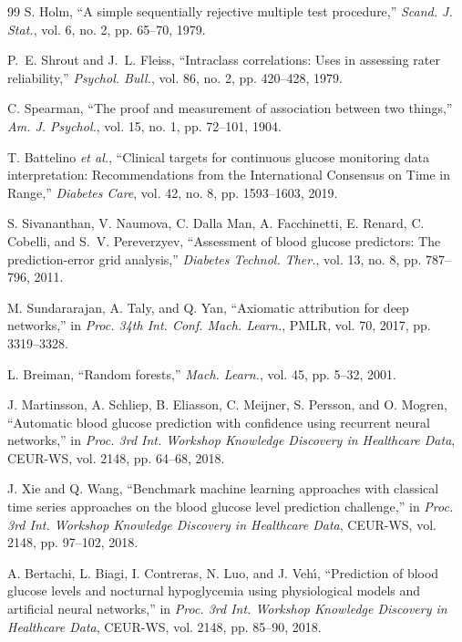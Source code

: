 \documentclass[journal]{IEEEtran}
\begin{document}
\begin{thebibliography}{99}
\label{ref49label} S. Holm, ``A simple sequentially rejective multiple test procedure,'' \emph{Scand. J. Stat.}, vol. 6, no. 2, pp. 65--70, 1979.

\label{ref50label} P.~E. Shrout and J.~L. Fleiss, ``Intraclass correlations: Uses in assessing rater reliability,'' \emph{Psychol. Bull.}, vol. 86, no. 2, pp. 420--428, 1979.

\label{ref51label} C. Spearman, ``The proof and measurement of association between two things,'' \emph{Am. J. Psychol.}, vol. 15, no. 1, pp. 72--101, 1904.

\label{ref52label} T. Battelino \emph{et al.}, ``Clinical targets for continuous glucose monitoring data interpretation: Recommendations from the International Consensus on Time in Range,'' \emph{Diabetes Care}, vol. 42, no. 8, pp. 1593--1603, 2019.

\label{ref53label} S. Sivananthan, V. Naumova, C. Dalla Man, A. Facchinetti, E. Renard, C. Cobelli, and S.~V. Pereverzyev, ``Assessment of blood glucose predictors: The prediction-error grid analysis,'' \emph{Diabetes Technol. Ther.}, vol. 13, no. 8, pp. 787--796, 2011.

\label{ref54label} M. Sundararajan, A. Taly, and Q. Yan, ``Axiomatic attribution for deep networks,'' in \emph{Proc. 34th Int. Conf. Mach. Learn.}, PMLR, vol. 70, 2017, pp. 3319--3328.

\label{ref55label} L. Breiman, ``Random forests,'' \emph{Mach. Learn.}, vol. 45, pp. 5--32, 2001.

\label{ref56label} J. Martinsson, A. Schliep, B. Eliasson, C. Meijner, S. Persson, and O. Mogren, ``Automatic blood glucose prediction with confidence using recurrent neural networks,'' in \emph{Proc. 3rd Int. Workshop Knowledge Discovery in Healthcare Data}, CEUR-WS, vol. 2148, pp. 64--68, 2018.

\label{ref57label} J. Xie and Q. Wang, ``Benchmark machine learning approaches with classical time series approaches on the blood glucose level prediction challenge,'' in \emph{Proc. 3rd Int. Workshop Knowledge Discovery in Healthcare Data}, CEUR-WS, vol. 2148, pp. 97--102, 2018.

\label{ref58label} A. Bertachi, L. Biagi, I. Contreras, N. Luo, and J. Veh\'{\i}, ``Prediction of blood glucose levels and nocturnal hypoglycemia using physiological models and artificial neural networks,'' in \emph{Proc. 3rd Int. Workshop Knowledge Discovery in Healthcare Data}, CEUR-WS, vol. 2148, pp. 85--90, 2018.


\end{thebibliography}
\end{document}
